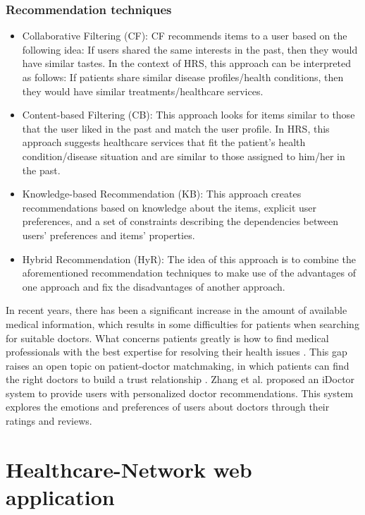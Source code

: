 \subsubsection{Recommendation techniques}

\begin{itemize}
    \item Collaborative Filtering (CF): CF recommends items to a user based on the following idea: If users shared the same interests in the past, then they would have similar tastes. In the context of HRS, this approach can be interpreted as follows: If patients share similar disease profiles/health conditions, then they would have similar treatments/healthcare services.
    \item Content-based Filtering (CB): This approach looks for items similar to those that the user liked in the past and match the user profile. In HRS, this approach suggests healthcare services that fit the patient's health condition/disease situation and are similar to those assigned to him/her in the past.
    \item Knowledge-based Recommendation (KB): This approach creates recommendations based on knowledge about the items, explicit user preferences, and a set of constraints describing the dependencies between users' preferences and items' properties.
    \item Hybrid Recommendation (HyR): The idea of this approach is to combine the aforementioned recommendation techniques to make use of the advantages of one approach and fix the disadvantages of another approach.
\end{itemize}

In recent years, there has been a significant increase in the amount of available medical information, which results in some difficulties for patients when searching for suitable doctors. What concerns patients greatly is how to find medical professionals with the best expertise for resolving their health issues \cite{narducci_recommender_2015, hoens_reliable_2010}. This gap raises an open topic on patient-doctor matchmaking, in which patients can find the right doctors to build a trust relationship \cite{han_hybrid_2018}.
Zhang et al. \cite{zhang_idoctor_2017} proposed an iDoctor system to provide users with personalized doctor recommendations. This system explores the emotions and preferences of users about doctors through their ratings and reviews.

\section{Healthcare-Network web application}

